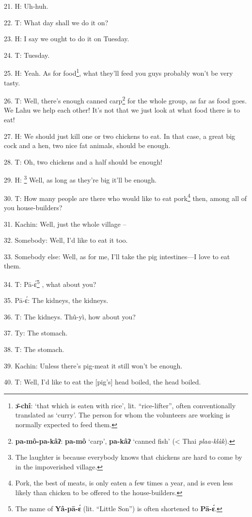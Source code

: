 21. H: Uh-huh.

22. T: What day shall we do it on?

23. H: I say we ought to do it on Tuesday.

24. T: Tuesday.

25. H: Yeah. As for food\footnote{\textbf{ɔ̄-chî}: `that which is eaten with rice', lit. ``rice-lifter'', often conventionally translated as `curry'. The person for whom the volunteers are working is normally expected to feed them.}, what they'll feed you guys probably won't be very
tasty.

26. T: Well, there's enough canned carp\footnote{\textbf{pa-mô-pa-kâʔ}: \textbf{pa-mô} `carp', \textbf{pa-kâʔ} `canned fish' (< Thai \textit{plaa-klàk}).} for the whole group, as far as food
goes. We Lahu we help each other! It's not that we just look at what food there
is to eat!

27. H: We should just kill one or two chickens to eat. In that case, a great big
cock and a hen, two nice fat animals, should be enough.

28. T: Oh, two chickens and a half should be enough!

29. H: \footnote{The laughter is because everybody knows that chickens are hard to come by in the impoverished village.} Well, as long as they're big it'll be enough.

30. T: How many people are there who would like to eat pork\footnote{Pork, the best of meats, is only eaten a few times a year, and is even less likely than chicken to be offered to the house-builders.} then, among all
of you house-builders?

31. Kachin: Well, just the whole village --

32. Somebody: Well, I'd like to eat it too.

33. Somebody else: Well, as for me, I'll take the pig intestines---I love to eat
them.

34. T: Pā-ɛ́\footnote{The name of \textbf{Yâ-pā-ɛ́} (lit. ``Little Son'') is often shortened to \textbf{Pā-ɛ́}.} , what about you?

35. Pā-ɛ́: The kidneys, the kidneys.

36. T: The kidneys. Thû-yì, how about you?

37. Ty: The stomach.

38. T: The stomach.

39. Kachin: Unless there's pig-meat it still won't be enough.

40. T: Well, I'd like to eat the [pig's] head boiled, the head boiled.

